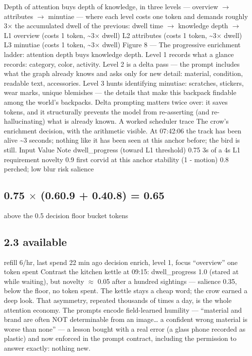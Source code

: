 Depth of attention buys depth of knowledge, in three levels --- overview \(\rightarrow\) attributes \(\rightarrow\) minutiae --- where each level costs one token and demands roughly 3\(\times\) the accumulated dwell of the previous: dwell time \(\rightarrow\) knowledge depth \(\rightarrow\) L1 overview (costs 1 token, \textasciitilde3\(\times\) dwell) L2 attributes (costs 1 token, \textasciitilde3\(\times\) dwell) L3 minutiae (costs 1 token, \textasciitilde3\(\times\) dwell) Figure 8 --- The progressive enrichment ladder: attention depth buys knowledge depth. Level 1 records what a glance records: category, color, activity. Level 2 is a delta pass --- the prompt includes what the graph already knows and asks only for new detail: material, condition, readable text, accessories. Level 3 hunts identifying minutiae: scratches, stickers, wear marks, unique blemishes --- the details that make this backpack findable among the world's backpacks. Delta prompting matters twice over: it saves tokens, and it structurally prevents the model from re-asserting (and re-hallucinating) what is already known. A worked scheduler trace The crow's enrichment decision, with the arithmetic visible. At 07:42:06 the track has been alive \textasciitilde3 seconds; nothing like it has been seen at this anchor before; the bird is still. Input Value Note dwell\_progress (toward L1 threshold) 0.75 3s of a 4s L1 requirement novelty 0.9 first corvid at this anchor stability (1 - motion) 0.8 perched; low blur risk salience

\subsection{\texorpdfstring{0.75 \(\times\) (0.6\textperiodcentered{}0.9 + 0.4\textperiodcentered{}0.8) = 0.65}{0.75 \textbackslash times (0.60.9 + 0.40.8) = 0.65}}\label{times-0.60.9-0.40.8-0.65}

above the 0.5 decision floor bucket tokens

\subsection{2.3 available}\label{available}

refill 6/hr, last spend 22 min ago decision enrich, level 1, focus ``overview'' one token spent Contrast the kitchen kettle at 09:15: dwell\_progress 1.0 (stared at while waiting), but novelty \(\approx\) 0.05 after a hundred sightings --- salience 0.35, below the floor, no token spent. The kettle stays a cheap word; the crow earned a deep look. That asymmetry, repeated thousands of times a day, is the whole attention economy. The prompts encode field-learned humility --- ``material and brand are often NOT determinable from an image\ldots{} a confident wrong material is worse than none'' --- a lesson bought with a real error (a glass phone recorded as plastic) and now enforced in the prompt contract, including the permission to answer exactly: nothing new.

